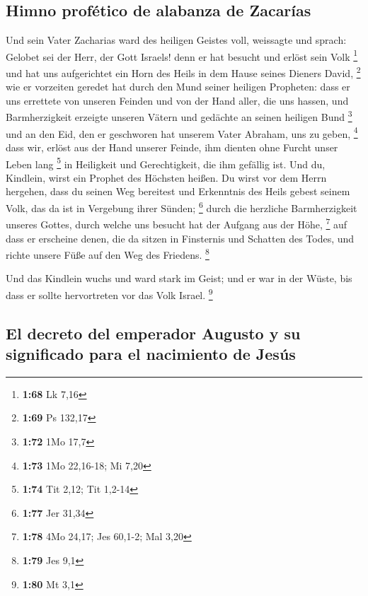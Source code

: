 \hypertarget{himno-profuxe9tico-de-alabanza-de-zacaruxedas}{%
\subsection{Himno profético de alabanza de
Zacarías}\label{himno-profuxe9tico-de-alabanza-de-zacaruxedas}}

 Und sein Vater Zacharias ward des heiligen Geistes voll,
weissagte und sprach:  Gelobet sei der Herr, der Gott
Israels! denn er hat besucht und erlöst sein Volk \footnote{\textbf{1:68}
  Lk 7,16}  und hat uns aufgerichtet ein Horn des Heils
in dem Hause seines Dieners David, \footnote{\textbf{1:69} Ps 132,17}
 wie er vorzeiten geredet hat durch den Mund seiner
heiligen Propheten:  dass er uns errettete von unseren
Feinden und von der Hand aller, die uns hassen,  und
Barmherzigkeit erzeigte unseren Vätern und gedächte an seinen heiligen
Bund \footnote{\textbf{1:72} 1Mo 17,7}  und an den Eid,
den er geschworen hat unserem Vater Abraham, uns zu geben, \footnote{\textbf{1:73}
  1Mo 22,16-18; Mi 7,20}  dass wir, erlöst aus der Hand
unserer Feinde, ihm dienten ohne Furcht unser Leben lang \footnote{\textbf{1:74}
  Tit 2,12; Tit 1,2-14}  in Heiligkeit und Gerechtigkeit,
die ihm gefällig ist.  Und du, Kindlein, wirst ein
Prophet des Höchsten heißen. Du wirst vor dem Herrn hergehen, dass du
seinen Weg bereitest  und Erkenntnis des Heils gebest
seinem Volk, das da ist in Vergebung ihrer Sünden; \footnote{\textbf{1:77}
  Jer 31,34}  durch die herzliche Barmherzigkeit unseres
Gottes, durch welche uns besucht hat der Aufgang aus der Höhe,
\footnote{\textbf{1:78} 4Mo 24,17; Jes 60,1-2; Mal 3,20} 
auf dass er erscheine denen, die da sitzen in Finsternis und Schatten
des Todes, und richte unsere Füße auf den Weg des Friedens. \footnote{\textbf{1:79}
  Jes 9,1}

 Und das Kindlein wuchs und ward stark im Geist; und er
war in der Wüste, bis dass er sollte hervortreten vor das Volk Israel.
\footnote{\textbf{1:80} Mt 3,1}

\hypertarget{el-decreto-del-emperador-augusto-y-su-significado-para-el-nacimiento-de-jesuxfas}{%
\subsection{El decreto del emperador Augusto y su significado para el
nacimiento de
Jesús}\label{el-decreto-del-emperador-augusto-y-su-significado-para-el-nacimiento-de-jesuxfas}}

